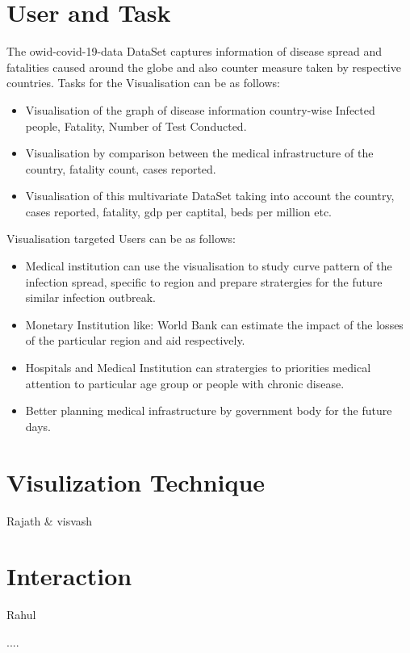\documentclass[10pt]{article}
\begin{document}
\section{User and Task}
The owid-covid-19-data DataSet captures information of disease spread  and fatalities caused around the globe and also counter measure taken by respective countries.\newline
Tasks for the Visualisation can be as follows:
\begin{itemize}
    \item Visualisation of the graph of disease information country-wise Infected people, Fatality, Number of Test Conducted.
    \item Visualisation by comparison between the medical infrastructure of the country, fatality count, cases reported.
    \item Visualisation of this multivariate DataSet taking into account the country, cases reported, fatality, gdp per captital, beds per million etc.
\end{itemize}
Visualisation targeted Users can be as follows:
\begin{itemize}
    \item Medical institution can use the visualisation to study curve pattern of the infection spread, specific to region and prepare stratergies for the future similar infection outbreak.
    \item Monetary Institution like: World Bank can estimate the impact of the losses of the particular region and aid respectively.
    \item Hospitals and Medical Institution can stratergies to priorities  medical attention to particular age group or people with chronic disease.
    \item Better planning medical infrastructure by government body for the future days.
\end{itemize}


\section{Visulization Technique}
Rajath \& visvash


\section{Interaction}
Rahul

....




%
%
\end{document}

